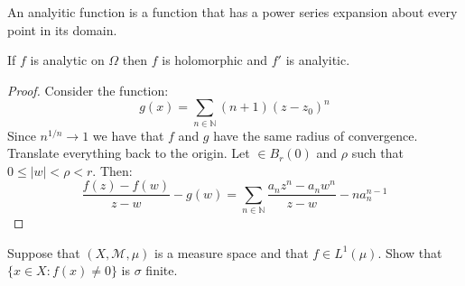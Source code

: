 \documentclass[crop=false,class=article]{standalone}                           %
\begin{document}
        An analyitic function is a function that has a power series expansion
        about every point in its domain.
        \begin{theorem}
            If $f$ is analytic on $\Omega$ then $f$ is holomorphic and $f'$ is
            analyitic.
        \end{theorem}
        \begin{proof}
            Consider the function:
            \begin{equation}
                g(x)=\sum_{n\in\mathbb{N}}(n+1)(z-z_{0})^{n}
            \end{equation}
            Since $n^{1/n}\rightarrow{1}$ we have that $f$ and $g$ have the
            same radius of convergence. Translate everything back to the origin.
            Let $\in{B}_{r}(0)$ and $\rho$ such that $0\leq|w|<\rho<r$. Then:
            \begin{equation}
                \frac{f(z)-f(w)}{z-w}-g(w)
                =\sum_{n\in\mathbb{N}}\frac{a_{n}z^{n}-a_{n}w^{n}}{z-w}-
                    na_{n}^{n-1}
            \end{equation}
        \end{proof}
        \begin{problem}
            Suppose that $(X,\mathcal{M},\mu)$ is a measure space and that
            $f\in{L}^{1}(\mu)$. Show that $\{x\in{X}:f(x)\ne{0}\}$ is $\sigma$
            finite.
        \end{problem}
\end{document}
